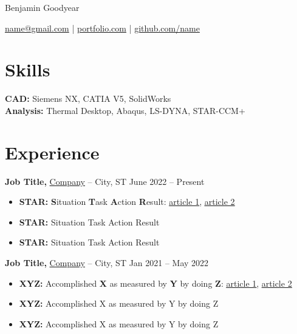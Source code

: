 \documentclass[11pt]{article}       %
\begin{document}
\centerline{\Huge Benjamin Goodyear}

\vspace{5pt}

\centerline{\href{mailto:name@gmail.com}{name@gmail.com} | \href{https://mitcommlab.mit.edu/meche/commkit/portfolio/}{portfolio.com} | \href{https://old.reddit.com/r/EngineeringResumes/wiki/index\#wiki_portfolios}{github.com/name}}

\vspace{-10pt}

\section*{Skills}
\textbf{CAD:} Siemens NX, CATIA V5, SolidWorks \\
\textbf{Analysis:} Thermal Desktop, Abaqus, LS-DYNA, STAR-CCM+

\vspace{-6.5pt}

\section*{Experience}
\textbf{Job Title,} \href{https://www.fstl1992.com/}{Company} -- City, ST \hfill June 2022 -- Present \\
\vspace{-9pt}
\begin{itemize}
  \item \textbf{STAR:} \textbf{S}ituation \textbf{T}ask \textbf{A}ction \textbf{R}esult: \href{https://www.levels.fyi/blog/applying-star-method-resumes.html}{\underline{article 1}}, \href{https://resumegenius.com/blog/resume-help/star-method-resume}{\underline{article 2}}
  \item \textbf{STAR:} Situation Task Action Result
  \item \textbf{STAR:} Situation Task Action Result
\end{itemize}

\textbf{Job Title,} \href{https://www.fstl1992.com/}{Company} -- City, ST \hfill Jan 2021 -- May 2022 \\
\vspace{-9pt}
\begin{itemize}
  \item \textbf{XYZ:} Accomplished \textbf{X} as measured by \textbf{Y} by doing \textbf{Z}: \href{https://www.inc.com/bill-murphy-jr/google-recruiters-say-these-5-resume-tips-including-x-y-z-formula-will-improve-your-odds-of-getting-hired-at-google.html}{\underline{article 1}}, \href{https://elevenrecruiting.com/create-an-effective-resume-xyz-resume-format/}{\underline{article 2}}
  \item \textbf{XYZ:} Accomplished X as measured by Y by doing Z
  \item \textbf{XYZ:} Accomplished X as measured by Y by doing Z
\end{itemize}
\end{document}
